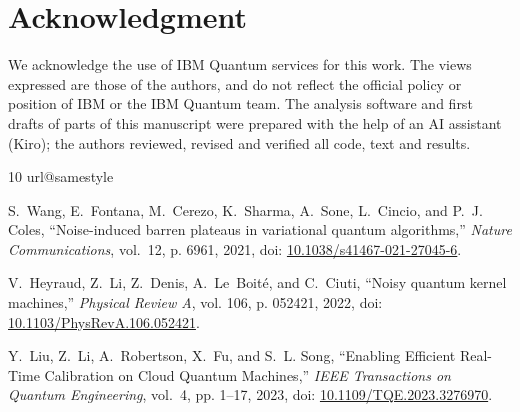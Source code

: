 \documentclass[10pt,conference]{IEEEtran}
\newif\ifshowrefs
\begin{document}
\section*{Acknowledgment}
We acknowledge the use of IBM Quantum services for this work. The views expressed are those of
the authors, and do not reflect the official policy or position of IBM or the IBM Quantum team.
The analysis software and first drafts of parts of this manuscript were prepared with the help
of an AI assistant (Kiro); the authors reviewed, revised and verified all code, text and results.

\ifshowrefs\else{}\vbox\bgroup\fi
\begin{thebibliography}{10}
\providecommand{\url}[1]{#1}
\csname url@samestyle\endcsname
\providecommand{\newblock}{\relax}
\providecommand{\bibinfo}[2]{#2}
\providecommand{\BIBentrySTDinterwordspacing}{\spaceskip=0pt\relax}
\providecommand{\BIBentryALTinterwordstretchfactor}{4}
\providecommand{\BIBentryALTinterwordspacing}{\spaceskip=\fontdimen2\font plus
\BIBentryALTinterwordstretchfactor\fontdimen3\font minus
  \fontdimen4\font\relax}
\providecommand{\BIBforeignlanguage}[2]{{%
\expandafter\ifx\csname l@#1\endcsname\relax
\typeout{** WARNING: IEEEtran.bst: No hyphenation pattern has been}%
\typeout{** loaded for the language `#1'. Using the pattern for}%
\typeout{** the default language instead.}%
\else
\language=\csname l@#1\endcsname
\fi
#2}}
\providecommand{\BIBdecl}{\relax}
\BIBdecl

S.~Wang, E.~Fontana, M.~Cerezo, K.~Sharma, A.~Sone, L.~Cincio, and P.~J. Coles,
  ``{Noise-induced barren plateaus in variational quantum algorithms},''
  \emph{Nature Communications}, vol.~12, p. 6961, 2021, doi:
  \href{https://doi.org/10.1038/s41467-021-27045-6}{10.1038/s41467-021-27045-6}.

V.~Heyraud, Z.~Li, Z.~Denis, A.~Le~Boit{\'e}, and C.~Ciuti, ``{Noisy quantum
  kernel machines},'' \emph{Physical Review A}, vol. 106, p. 052421, 2022, doi:
  \href{https://doi.org/10.1103/PhysRevA.106.052421}{10.1103/PhysRevA.106.052421}.

Y.~Liu, Z.~Li, A.~Robertson, X.~Fu, and S.~L. Song, ``{Enabling Efficient
  Real-Time Calibration on Cloud Quantum Machines},'' \emph{IEEE Transactions
  on Quantum Engineering}, vol.~4, pp. 1--17, 2023, doi:
  \href{https://doi.org/10.1109/TQE.2023.3276970}{10.1109/TQE.2023.3276970}.


\end{thebibliography}
\end{document}
